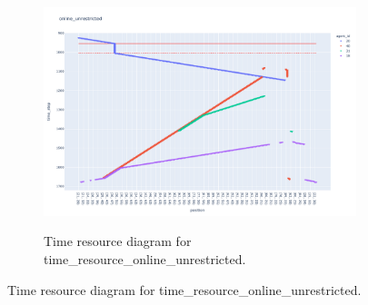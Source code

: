 \documentclass{article}
\begin{document}
\begin{figure}
    \begin{subfigure}{\textwidth}
        \includegraphics[width=\textwidth]{Figures/05_use_cases/time_resource_online_unrestricted.pdf}
        \label{fig:cost_equivalence_time_resource_online_unrestricted}
        \caption{Time resource diagram for time\_resource\_online\_unrestricted.}
    \end{subfigure}


\end{figure}
\end{document}
